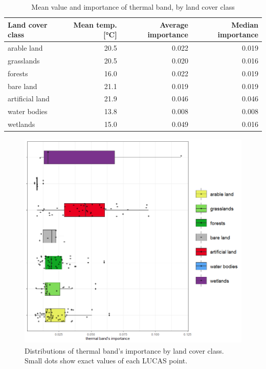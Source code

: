 \documentclass{amuthesis}
\begin{document}
\hypertarget{tbl-tabela6}{}
\begin{table}
\caption{\label{tbl-tabela6}Mean value and importance of thermal band, by land cover class }\tabularnewline

\centering
\begin{tabular}{|>{}l|>{}r|>{}r|>{}r|}
\toprule
\textbf{Land cover class} & \textbf{Mean temp. [°C]} & \textbf{Average importance} & \textbf{Median importance}\\
\midrule
arable land & 20.5 & 0.022 & 0.019\\
\hline
grasslands & 20.5 & 0.020 & 0.016\\
\hline
forests & 16.0 & 0.022 & 0.019\\
\hline
bare land & 21.1 & 0.019 & 0.019\\
\hline
artificial land & 21.9 & 0.046 & 0.046\\
\hline
water bodies & 13.8 & 0.008 & 0.008\\
\hline
wetlands & 15.0 & 0.049 & 0.016\\
\bottomrule
\end{tabular}
\end{table}

\begin{figure}[H]

{\centering \includegraphics[width=4.45833in,height=4.16667in]{./figures/importance_classes.png}

}

\caption{\label{fig-rycina14}Distributions of thermal band's importance
by land cover class. Small dots show exact values of each LUCAS point.}

\end{figure}
\end{document}
